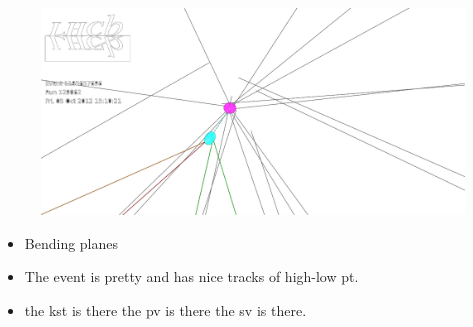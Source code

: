 \begin{figure}[t]
  \centering
  \begin{turn}{90}
    \includegraphics[width=1.5\textwidth]{Figures/Chapter2/jpsikst_event.pdf}
  \end{turn}
  \caption{}
\end{figure}

\begin{itemize}
  \item Bending planes
  \item The event is pretty and has nice tracks of high-low pt.
  \item the kst is there the pv is there the sv is there.
\end{itemize}
